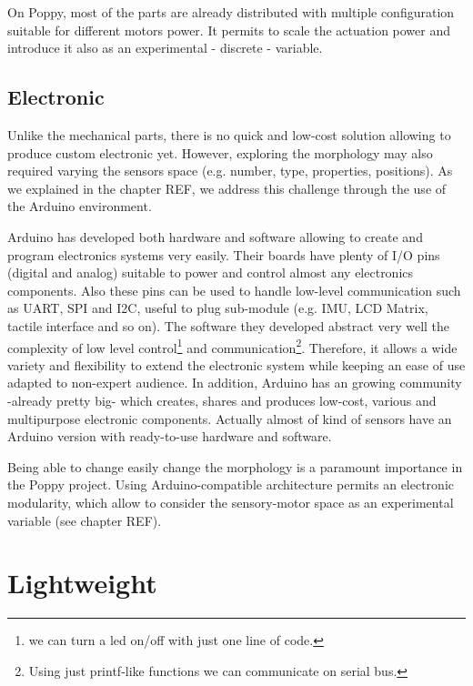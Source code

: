 On Poppy, most of the parts are already distributed with multiple configuration suitable for different motors power. It permits to scale the actuation power and introduce it also as an experimental - discrete - variable.


\subsection{Electronic} %

Unlike the mechanical parts, there is no quick and low-cost solution allowing to produce custom electronic yet.
However, exploring the morphology may also required varying the sensors space (e.g. number, type, properties, positions). As we explained in the chapter REF, we address this challenge through the use of the Arduino environment.

Arduino has developed both hardware and software allowing to create and program electronics systems very easily. Their boards have plenty of I/O pins (digital and analog) suitable to power and control almost any electronics components. Also these pins can be used to handle low-level communication such as UART, SPI and I2C, useful to plug sub-module (e.g. IMU, LCD Matrix, tactile interface and so on).
The software they developed abstract very well the complexity of low level control\footnote{we can turn a led on/off with just one line of code.} and communication\footnote{Using just printf-like functions we can communicate on serial bus.}. Therefore, it allows a wide variety and flexibility to extend the electronic system while keeping an ease of use adapted to non-expert audience.
In addition, Arduino has an growing community -already pretty big- which creates, shares and produces low-cost, various and multipurpose electronic components. Actually almost of kind of sensors have an Arduino version with ready-to-use hardware and software.

Being able to change easily change the morphology is a paramount importance in the Poppy project. Using Arduino-compatible architecture permits an electronic modularity, which allow to consider the sensory-motor space as an experimental variable (see chapter REF).


\section{Lightweight} %

